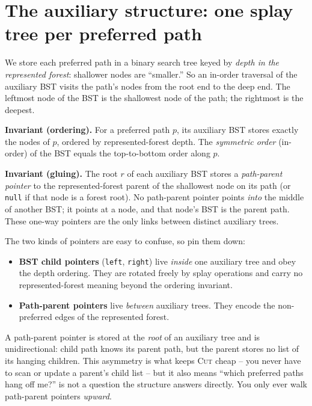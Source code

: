 \section{The auxiliary structure: one splay tree per preferred path}
\label{ch22:aux}

We store each preferred path in a binary search tree keyed by \emph{depth in the
represented forest}: shallower nodes are ``smaller.'' So an in-order traversal of
the auxiliary BST visits the path's nodes from the root end to the deep end. The
leftmost node of the BST is the shallowest node of the path; the rightmost is the
deepest.

\begin{formalbox}
\textbf{Invariant (ordering).} For a preferred path $p$, its auxiliary BST stores
exactly the nodes of $p$, ordered by represented-forest depth. The
\emph{symmetric order} (in-order) of the BST equals the top-to-bottom order along
$p$.

\textbf{Invariant (gluing).} The root $r$ of each auxiliary BST stores a
\emph{path-parent pointer} to the represented-forest parent of the shallowest
node on its path (or \texttt{null} if that node is a forest root). No path-parent
pointer points \emph{into} the middle of another BST; it points at a node, and
that node's BST is the parent path. These one-way pointers are the only links
between distinct auxiliary trees.
\end{formalbox}

The two kinds of pointers are easy to confuse, so pin them down:

\begin{itemize}
  \item \textbf{BST child pointers} (\texttt{left}, \texttt{right}) live
        \emph{inside} one auxiliary tree and obey the depth ordering. They are
        rotated freely by splay operations and carry no represented-forest
        meaning beyond the ordering invariant.
  \item \textbf{Path-parent pointers} live \emph{between} auxiliary trees. They
        encode the non-preferred edges of the represented forest.
\end{itemize}

\begin{trapbox}
A path-parent pointer is stored at the \emph{root} of an auxiliary tree and is
unidirectional: child path knows its parent path, but the parent stores no list
of its hanging children. This asymmetry is what keeps \textsc{Cut} cheap -- you
never have to scan or update a parent's child list -- but it also means
``which preferred paths hang off me?'' is not a question the structure answers
directly. You only ever walk path-parent pointers \emph{upward}.
\end{trapbox}


